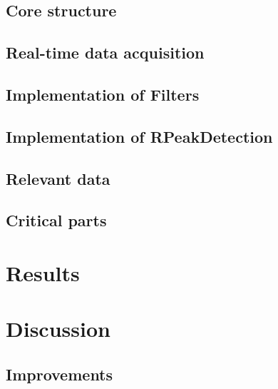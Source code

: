 \documentclass[12pt,a4paper]{article}
\begin{document}
\subsection{Core structure}

\subsection{Real-time data acquisition}

\subsection{Implementation of Filters}
	
\subsection{Implementation of RPeakDetection}
	
\subsection{Relevant data}
	
\subsection{Critical parts}

\section{Results}
	

\section{Discussion}
	
\subsection{Improvements}
\end{document}
